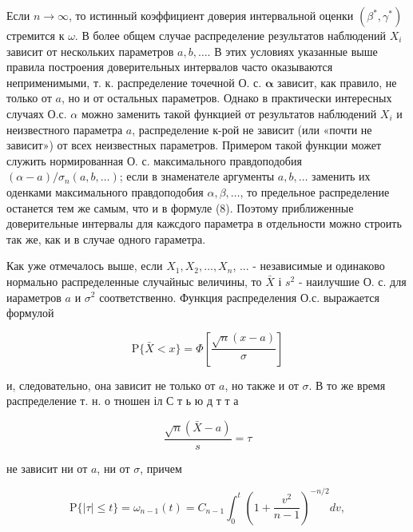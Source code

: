\documentclass[10pt]{article}
\begin{document}
Если $n \rightarrow \infty$, то истинный коэффициент доверия интервальной оценки $\left(\beta^{*}, \gamma^{*}\right)$ стремится к $\omega$. В более общем случае распределение результатов наблюдений $X_{i}$ зависит от нескольких параметров $a, b, \ldots$. В этих условиях указанные выше правила построения доверительных интервалов часто оказываются неприменимыми, т. к. распределение точечной О. с. $\boldsymbol{\alpha}$ зависит, как правило, не только от $a$, но и от остальных параметров. Однако в практически интересных случаях О.с. $\alpha$ можно заменить такой функцией от результатов наблюдений $X_{i}$ и неизвестного параметра $a$, распределение к-рой не зависит (или «почти не зависит») от всех неизвестных параметров. Примером такой функции может служить нормированная О. с. максимального правдоподобия $(\alpha-a) / \sigma_{n}(a, b, \ldots)$; если в знаменателе аргументы $a, b, \ldots$ заменить их оденками максимального правдоподобия $\alpha, \beta, \ldots$, то предельное распределение останется тем же самым, что и в формуле (8). Поэтому приближенные доверительные интервалы для кажсдого параметра в отдельности можно строить так же, как и в случае одного гараметра.



Как уже отмечалось выше, если $X_{1}, X_{2}, \ldots, X_{n}$, ... - независимые и одинаково нормально распределенные случайныс величины, то $\bar{X}$ і $s^{2}$ - наилучшие О. с. для иараметров $a$ и $\sigma^{2}$ соответственно. Функция распределения О.с. выражается формулой



\[

\mathrm{P}\{\bar{X}<x\}=\Phi\left[\frac{\sqrt{n}(x-a)}{\sigma}\right]

\]



и, следовательно, она зависит не только от $a$, но также и от $\sigma$. В то же время распределение т. н. о тношен іл С т ь ю д т т а



\[

\frac{\sqrt{n}(\bar{X}-a)}{s}=\tau

\]



не зависит ни от $a$, ни от $\sigma$, причем



\[

\mathrm{P}\{|\tau| \leqslant t\}=\omega_{n-1}(t)=C_{n-1} \int_{0}^{t}\left(1+\frac{v^{2}}{n-1}\right)^{-n / 2} d v,

\]
\end{document}
